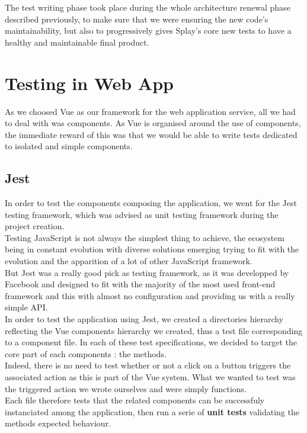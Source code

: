 \documentclass{eplmastersthesis}
\begin{document}
    The test writing phase took place during the whole architecture renewal
    phase described previously, to make sure that we were ensuring the new
    code's maintainability, but also to progressively gives Splay's core
    new tests to have a healthy and maintainable final product.

    \section{Testing in Web App}

      As we choosed Vue as our framework for the web application service,
      all we had to deal with was components. As Vue is organised around
      the use of components, the immediate reward of this was that we would
      be able to write tests dedicated to isolated and simple components.

      \subsection{Jest}

        In order to test the components composing the application, we
        went for the Jest \cite{jest} testing framework, which was advised
        as unit testing framework during the project creation.\\

        Testing JavaScript is not always the simplest thing to achieve, the
        ecosystem being in constant evolution with diverse solutions emerging
        trying to fit with the evolution and the apparition of a lot of
        other JavaScript framework.\\
        But Jest was a really good pick as testing framework, as it was
        developped by Facebook and designed to fit with the majority of the
        most used front-end framework and this with almost no configuration and
        providing us with a really simple API.\\

        In order to test the application using Jest, we created a directories
        hierarchy reflecting the Vue components hierarchy we created, thus
        a test file corresponding to a component file. In each of these
        test specifications, we decided to target the core part of each
        components : the methods.\\
        Indeed, there is no need to test whether or not a click on a button
        triggers the associated action as this is part of the Vue system. What
        we wanted to test was the triggered action we wrote ourselves and
        were simply functions.\\
        Each file therefore tests that the related components can be
        successfuly instanciated among the application, then run a serie
        of \textbf{unit tests} validating the methods expected behaviour.
\end{document}
